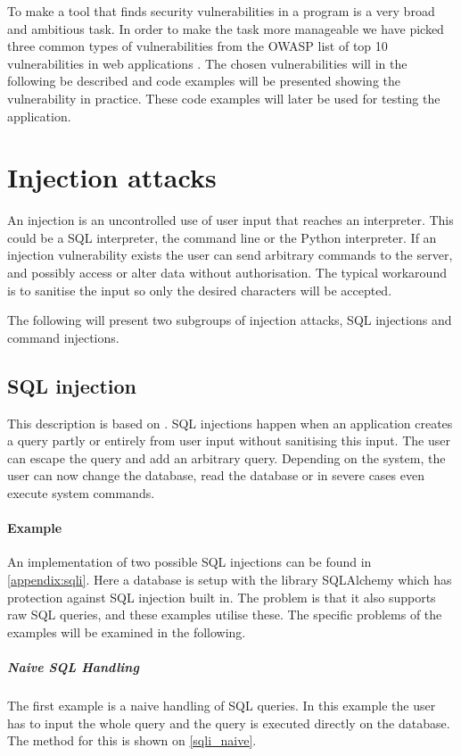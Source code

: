 \label{security_vulnerabilities}
To make a tool that finds security vulnerabilities in a program is a very broad and ambitious task.
In order to make the task more manageable we have picked three common types of vulnerabilities from the OWASP list of top 10 vulnerabilities in web applications \cite{OWASP10}.
The chosen vulnerabilities will in the following be described and code examples will be presented showing the vulnerability in practice.
These code examples will later be used for testing the application.

\section{Injection attacks}\label{vulnerabilities:injection}
An injection is an uncontrolled use of user input that reaches an interpreter.
This could be a SQL interpreter, the command line or the Python interpreter.
If an injection vulnerability exists the user can send arbitrary commands to the server, and possibly access or alter data without authorisation.
The typical workaround is to sanitise the input so only the desired characters will be accepted. \citep{OWASPTOP10PDF}

The following will present two subgroups of injection attacks, SQL injections and command injections.

\subsection{SQL injection}
This description is based on \citet{sqlinjection}.
SQL injections happen when an application creates a query partly or entirely from user input without sanitising this input.
The user can escape the query and add an arbitrary query.
Depending on the system, the user can now change the database, read the database or in severe cases even execute system commands.

\paragraph{Example} An implementation of two possible SQL injections can be found in \cref{appendix:sqli}.
Here a database is setup with the library SQLAlchemy which has protection against SQL injection built in.
The problem is that it also supports raw SQL queries, and these examples utilise these.
The specific problems of the examples will be examined in the following.

\subparagraph{Naive SQL Handling}
The first example is a naive handling of SQL queries.
In this example the user has to input the whole query and the query is executed directly on the database.
The method for this is shown on \cref{sqli_naive}.

